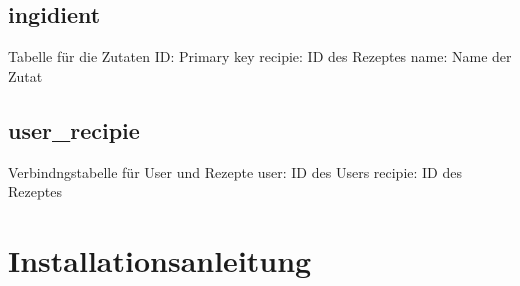 \documentclass{article}
\begin{document}
\subsection{ingidient}
Tabelle für die Zutaten
ID: Primary key
\newline
recipie: ID des Rezeptes
\newline
name: Name der Zutat

\subsection{user\_recipie}
Verbindngstabelle für User und Rezepte
user: ID des Users
\newline
recipie: ID des Rezeptes

\section{Installationsanleitung}
\end{document}
